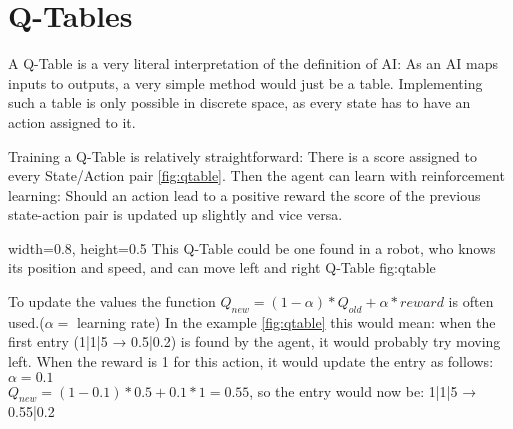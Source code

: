 \section{Q-Tables}
\label{sec:QTable}
A Q-Table is a very literal interpretation of the definition of AI: As an AI maps inputs to outputs, a very simple method would just be a table. Implementing such a table is only possible in discrete space, as every state has to have an action assigned to it.

Training a Q-Table is relatively straightforward: There is a score assigned to every State/Action pair \autoref{fig:qtable}. Then the agent can learn with reinforcement learning: Should an action lead to a positive reward the score of the previous state-action pair is updated up slightly and vice versa.

    {width=0.8\textwidth, height=0.5\textheight} %
    {This Q-Table could be one found in a robot, who knows its position and speed, and can move left and right}   %
    {Q-Table}   %
    {fig:qtable}    %

To update the values the function $Q_{new}=(1-\alpha)*Q_{old}+\alpha*reward$ is often used.($\alpha=$ learning rate)
In the example \autoref{fig:qtable} this would mean: when the first entry (1|1|5 → 0.5|0.2) is found by the agent, it would probably try moving left. When the reward is 1 for this action, it would update the entry as follows: $\alpha=0.1$\\$Q_{new}=(1-0.1)*0.5+0.1*1=0.55$, so the entry would now be: 1|1|5 → 0.55|0.2

